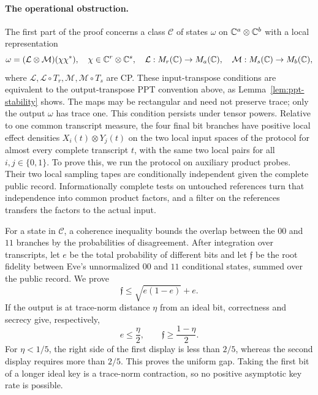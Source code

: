 \paragraph{The operational obstruction.}
The first part of the proof concerns a class $\mathscr C$ of states
$\omega$ on $\mathbb C^a\otimes\mathbb C^b$ with a local representation
\[
 \omega=(\mathcal L\otimes\mathcal M)(\chi\chi^*),
 \quad
 \chi\in\mathbb C^r\otimes\mathbb C^s,\quad
 \mathcal L:M_{r}(\mathbb C)\to M_{a}(\mathbb C),\quad
 \mathcal M:M_{s}(\mathbb C)\to M_{b}(\mathbb C),
\]
where $\mathcal L,\mathcal L\circ T_r,\mathcal M,\mathcal M\circ T_s$
are CP.  These input-transpose conditions are equivalent to the
output-transpose PPT convention above, as Lemma~\ref{lem:ppt-stability}
shows.  The maps may be rectangular and need not preserve trace; only
the output $\omega$ has trace one.  This condition persists under tensor powers.
Relative to one common transcript measure, the four final bit branches have
positive local effect densities $X_i(t)\otimes Y_j(t)$ on the two local
input spaces of the protocol for almost every
complete transcript $t$, with the same two local pairs for all
$i,j\in\{0,1\}$.  To prove this, we run the protocol on auxiliary
product probes.  Their two local sampling tapes are conditionally independent
given the complete public record.  Informationally complete tests on
untouched references turn that independence into common product factors,
and a filter on the references transfers the factors to the actual input.

For a state in $\mathscr C$, a coherence inequality bounds the overlap
between the $00$ and $11$ branches by the probabilities of disagreement.
After integration over transcripts, let $e$ be the total probability of
different bits and let $\mathfrak f$ be the root fidelity between Eve's
unnormalized $00$ and $11$ conditional states, summed over the public
record.  We prove
\[
                  \mathfrak f\leq\sqrt{e(1-e)}+e.
\]
If the output is at trace-norm distance $\eta$ from an ideal bit, correctness
and secrecy give, respectively,
\[
                 e\leq\frac\eta2,
       \qquad \mathfrak f\geq\frac{1-\eta}{2}.
\]
For $\eta<1/5$, the right side of the first display is less than $2/5$,
whereas the second display requires more than $2/5$.  This proves the uniform
gap.  Taking the first bit of a longer ideal key is a trace-norm contraction,
so no positive asymptotic key rate is possible.

